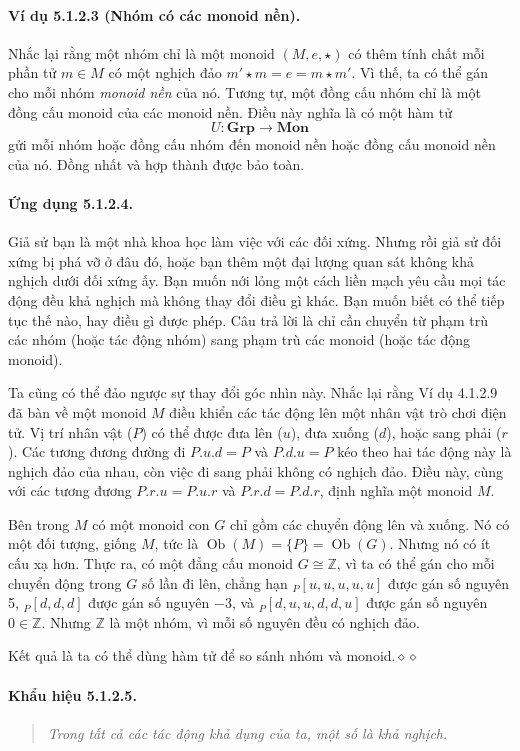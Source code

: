 \paragraph{Ví dụ 5.1.2.3 (Nhóm có các monoid nền).} Nhắc lại rằng một nhóm chỉ là một monoid $(M,e,\star)$ có thêm tính chất mỗi phần tử $m\in M$ có một nghịch đảo $m'\star m=e=m\star m'$. Vì thế, ta có thể gán cho mỗi nhóm \emph{monoid nền} của nó. Tương tự, một đồng cấu nhóm chỉ là một đồng cấu monoid của các monoid nền. Điều này nghĩa là có một hàm tử
\[U:\mathbf{Grp}\longrightarrow\mathbf{Mon}\]
gửi mỗi nhóm hoặc đồng cấu nhóm đến monoid nền hoặc đồng cấu monoid nền của nó. Đồng nhất và hợp thành được bảo toàn.
\paragraph{Ứng dụng 5.1.2.4.} Giả sử bạn là một nhà khoa học làm việc với các đối xứng. Nhưng rồi giả sử đối xứng bị phá vỡ ở đâu đó, hoặc bạn thêm một đại lượng quan sát không khả nghịch dưới đối xứng ấy. Bạn muốn nới lỏng một cách liền mạch yêu cầu mọi tác động đều khả nghịch mà không thay đổi điều gì khác. Bạn muốn biết có thể tiếp tục thế nào, hay điều gì được phép. Câu trả lời là chỉ cần chuyển từ phạm trù các nhóm (hoặc tác động nhóm) sang phạm trù các monoid (hoặc tác động monoid).

Ta cũng có thể đảo ngược sự thay đổi góc nhìn này. Nhắc lại rằng Ví dụ 4.1.2.9 đã bàn về một monoid $M$ điều khiển các tác động lên một nhân vật trò chơi điện tử. Vị trí nhân vật ($P$) có thể được đưa lên ($u$), đưa xuống ($d$), hoặc sang phải ($r$). Các tương đương đường đi $P.u.d=P$ và $P.d.u=P$ kéo theo hai tác động này là nghịch đảo của nhau, còn việc đi sang phải không có nghịch đảo. Điều này, cùng với các tương đương $P.r.u=P.u.r$ và $P.r.d=P.d.r$, định nghĩa một monoid $M$.

Bên trong $M$ có một monoid con $G$ chỉ gồm các chuyển động lên và xuống. Nó có một đối tượng, giống $M$, tức là $\operatorname{Ob}(M)=\{P\}=\operatorname{Ob}(G)$. Nhưng nó có ít cấu xạ hơn. Thực ra, có một đẳng cấu monoid $G\cong\mathbb Z$, vì ta có thể gán cho mỗi chuyển động trong $G$ số lần đi lên, chẳng hạn ${}_{P}[u,u,u,u,u]$ được gán số nguyên 5, ${}_{P}[d,d,d]$ được gán số nguyên $-3$, và ${}_{P}[d,u,u,d,d,u]$ được gán số nguyên $0\in\mathbb Z$. Nhưng $\mathbb Z$ là một nhóm, vì mỗi số nguyên đều có nghịch đảo.

Kết quả là ta có thể dùng hàm tử để so sánh nhóm và monoid.\hfill$\diamond\diamond$
\paragraph{Khẩu hiệu 5.1.2.5.}
\begin{quote}\emph{Trong tất cả các tác động khả dụng của ta, một số là khả nghịch.}\end{quote}
